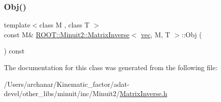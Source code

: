\mbox{\label{classROOT_1_1Minuit2_1_1MatrixInverse_3_01vec_00_01M_00_01T_01_4_a9d034050e7fbadfbbf24613a54c8ed93}} 
\subsubsection{\texorpdfstring{Obj()}{Obj()}\hspace{0.1cm}{\footnotesize\ttfamily [3/3]}}
{\footnotesize\ttfamily template$<$class M , class T $>$ \\
const M\& \mbox{\hyperlink{classROOT_1_1Minuit2_1_1MatrixInverse}{R\+O\+O\+T\+::\+Minuit2\+::\+Matrix\+Inverse}}$<$ \mbox{\hyperlink{classROOT_1_1Minuit2_1_1vec}{vec}}, M, T $>$\+::Obj (\begin{DoxyParamCaption}{ }\end{DoxyParamCaption}) const\hspace{0.3cm}{\ttfamily [inline]}}



The documentation for this class was generated from the following file\+:\begin{DoxyCompactItemize}
\item 
/\+Users/archanar/\+Kinematic\+\_\+factor/adat-\/devel/other\+\_\+libs/minuit/inc/\+Minuit2/\mbox{\hyperlink{adat-devel_2other__libs_2minuit_2inc_2Minuit2_2MatrixInverse_8h}{Matrix\+Inverse.\+h}}\end{DoxyCompactItemize}
